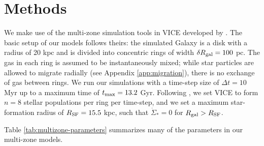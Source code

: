 \documentclass[twocolumn,twocolappendix,linenumbers,trackchanges]{aastex631}
\begin{document}
\section{Methods}
\label{sec:methods}

We make use of the multi-zone simulation tools in VICE developed by \citet{Johnson2021-Migration}. The basic setup of our models follows theirs: the simulated Galaxy is a disk with a radius of 20 kpc and is divided into concentric rings of width $\delta R_{\rm gal}=100$ pc. The gas in each ring is assumed to be instantaneously mixed; while star particles are allowed to migrate radially (see Appendix \ref{app:migration}), there is no exchange of gas between rings. We run our simulations with a time-step size of $\Delta t=10$ Myr up to a maximum time of $t_{\rm max}=13.2$ Gyr. Following \citet{Johnson2021-Migration}, we set VICE to form $n=8$ stellar populations per ring per time-step, and we set a maximum star-formation radius of $R_{\rm SF} = 15.5$ kpc, such that $\dot\Sigma_*=0$ for $R_{\rm gal}>R_{\rm SF}$.

Table \ref{tab:multizone-parameters} summarizes many of the parameters in our multi-zone models.
\end{document}

